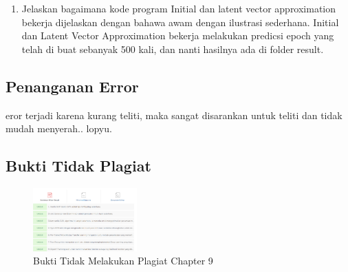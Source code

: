 \begin{enumerate}
		

        	\item Jelaskan bagaimana kode program Initial dan latent vector approximation bekerja dijelaskan dengan bahawa awam dengan ilustrasi sederhana.
Initial dan Latent Vector Approximation bekerja melakukan predicsi epoch yang telah di buat sebanyak 500 kali, dan nanti hasilnya ada di folder result.

		


\end{enumerate}

\subsection{Penanganan Error}
eror terjadi karena kurang teliti, maka sangat disarankan untuk teliti dan tidak mudah menyerah.. lopyu.


\subsection{Bukti Tidak Plagiat}
\begin{figure}[H]
\centering
	\includegraphics[width=4cm]{figures/1174009/9/bukticekplagiarismechapter9.PNG}
	\caption{Bukti Tidak Melakukan Plagiat Chapter 9}
\end{figure}